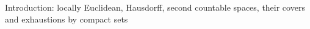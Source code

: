 Introduction: locally Euclidean, Hausdorff, second countable spaces, their covers and exhaustions by compact sets
